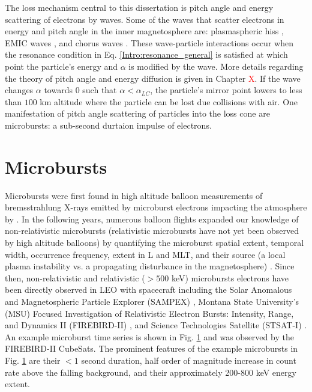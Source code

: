 The loss mechanism central to this dissertation is pitch angle and energy scattering of electrons by waves. Some of the waves that scatter electrons in energy and pitch angle in the inner magnetosphere are: plasmaspheric hiss \citep[e.g.][]{O'Brien2014, Breneman2015}, EMIC waves \citep[e.g.][]{Hendry2017, Capannolo2019energetic}, and chorus waves \citep[e.g.][]{Breneman2017, Kasahara2018, Ozaki2019}. These wave-particle interactions occur when the resonance condition in Eq. \ref{Intro:resonance_general} is satisfied at which point the particle's energy and $\alpha$ is modified by the wave. More details regarding the theory of pitch angle and energy diffusion is given in Chapter \textcolor{red}{X}. If the wave changes $\alpha$ towards $0$ such that $\alpha < \alpha_{LC}$, the particle's mirror point lowers to less than $100$ km altitude where the particle can be lost due collisions with air. One manifestation of pitch angle scattering of particles into the loss cone are microbursts: a sub-second durtaion impulse of electrons.

\section{Microbursts}\label{Intro:microbursts}
Microbursts were first found in high altitude balloon measurements of bremsstrahlung X-rays emitted by microburst electrons impacting the atmosphere by \citet{Anderson1964}. In the following years, numerous balloon flights expanded our knowledge of non-relativistic microbursts (relativistic microbursts have not yet been observed by high altitude balloons) by quantifying the microburst spatial extent, temporal width, occurrence frequency, extent in L and MLT, and their source (a local plasma instability vs. a propagating disturbance in the magnetosphere) \citep[e.g.][]{Trefall1966, Brown1965_2, Barcus1966, Parks1967}. Since then, non-relativistic and relativistic ($> 500$ keV) microbursts electrons have been directly observed in LEO with spacecraft including the Solar Anomalous and Magnetospheric Particle Explorer (SAMPEX) \citep[e.g.][]{Blake1996, Blum2015, Lorentzen2001a, Lorentzen2001b, Nakamura1995, Nakamura2000, O'Brien2003, O'Brien2004, Greeley2019, Douma2017, Douma2019},  Montana State University's (MSU) Focused Investigation of Relativistic Electron Bursts: Intensity, Range, and Dynamics II (FIREBIRD-II) \citep{Spence2012, Klumpar2015, Crew2016, Anderson2017, Breneman2017}, and Science Technologies Satellite (STSAT-I) \citep[e.g.][]{Lee2005, Lee2012}. An example microburst time series is shown in Fig. \ref{Intro:microbursts} and was observed by the FIREBIRD-II CubeSats. The prominent features of the example microbursts in Fig. \ref{Intro:microbursts} are their $< 1$ second duration, half order of magnitude increase in count rate above the falling background, and their approximately 200-800 keV energy extent.


